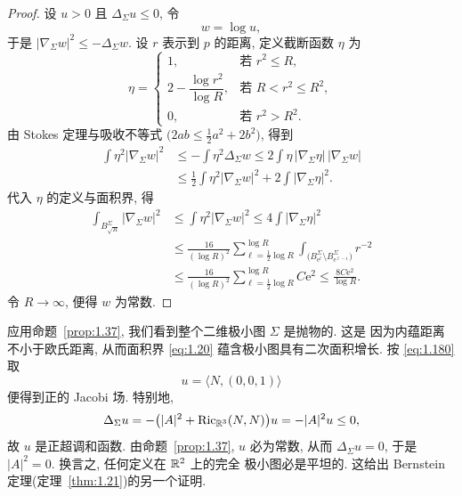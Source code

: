 \begin{proof}
设 $u>0$ 且 $\Delta_{\Sigma}u\leq0$, 令
\begin{equation}
w=\log u,
\label{eq:1.182}
\end{equation}
于是 $|\nabla_{\Sigma}w|^{2}\leq-\Delta_{\Sigma}w$. 设 $r$ 表示到 $p$ 的距离,
定义截断函数 $\eta$ 为
\begin{equation}
\eta=
\begin{cases}
1, & \text{若 } r^{2}\leq R,\\
2-\dfrac{\log r^{2}}{\log R}, & \text{若 } R<r^{2}\leq R^{2},\\
0, & \text{若 } r^{2}>R^{2}.
\end{cases}
\label{eq:1.183}
\end{equation}
由 Stokes 定理与吸收不等式 $\bigl(2ab\leq\frac12a^{2}+2b^{2}\bigr)$, 得到
\begin{equation}
\begin{aligned}
\int\eta^{2}|\nabla_{\Sigma}w|^{2}
&\leq-\int\eta^{2}\Delta_{\Sigma}w
 \leq2\int\eta\,|\nabla_{\Sigma}\eta|\,|\nabla_{\Sigma}w|\\
&\leq\frac12\int\eta^{2}|\nabla_{\Sigma}w|^{2}
 +2\int|\nabla_{\Sigma}\eta|^{2}.
\end{aligned}
\label{eq:1.184}
\end{equation}
代入 $\eta$ 的定义与面积界, 得
\begin{equation}
\begin{aligned}
\int_{B_{\sqrt R}^{\Sigma}}|\nabla_{\Sigma}w|^{2}
&\leq\int\eta^{2}|\nabla_{\Sigma}w|^{2}
 \leq4\int|\nabla_{\Sigma}\eta|^{2}\\
&\leq\frac{16}{(\log R)^{2}}
 \sum_{\ell=\frac12\log R}^{\log R}
 \int_{\bigl(B_{\mathrm{e}^{\ell}}^{\Sigma}
 \setminus B_{\mathrm{e}^{\ell-1}}^{\Sigma}\bigr)}r^{-2}\\
&\leq\frac{16}{(\log R)^{2}}
 \sum_{\ell=\frac12\log R}^{\log R}C\mathrm{e}^{2}
 \leq\frac{8C\mathrm{e}^{2}}{\log R}.
\end{aligned}
\label{eq:1.185}
\end{equation}
令 $R\to\infty$, 便得 $w$ 为常数.
\end{proof}

应用命题~\ref{prop:1.37}, 我们看到整个二维极小图 $\Sigma$ 是抛物的. 这是
因为内蕴距离不小于欧氏距离, 从而面积界 \eqref{eq:1.20} 蕴含极小图具有二次面积增长.
按 \eqref{eq:1.180} 取
\begin{equation}
u=\bigl\langle N,(0,0,1)\bigr\rangle
\label{eq:1.186}
\end{equation}
便得到正的 Jacobi 场. 特别地,
\begin{equation}
\Delta_{\Sigma}u
 =-\bigl(|A|^{2}+\operatorname{Ric}_{\mathbb{R}^3}(N,N)\bigr)u
 =-|A|^{2}u\leq0,
\label{eq:1.187}
\end{equation}
故 $u$ 是正超调和函数. 由命题~\ref{prop:1.37}, $u$ 必为常数, 从而
$\Delta_{\Sigma}u=0$, 于是 $|A|^{2}=0$. 换言之, 任何定义在 $\mathbb{R}^2$ 上的完全
极小图必是平坦的. 这给出 Bernstein 定理(定理~\ref{thm:1.21})的另一个证明.

